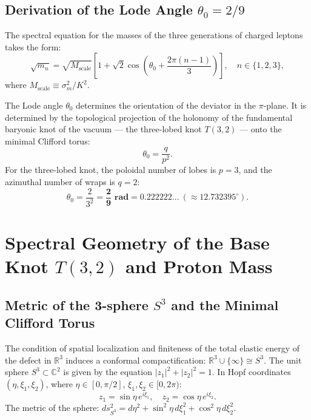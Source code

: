 \documentclass[12pt,a4paper]{article}
\begin{document}
	\subsection{Derivation of the Lode Angle $\theta_0 = 2/9$}
	The spectral equation for the masses of the three generations of charged leptons takes the form:
	\begin{equation}
	\sqrt{m_n} = \sqrt{M_{\text{scale}}} \left[ 1 + \sqrt{2} \cos\left( \theta_0 + \frac{2\pi(n-1)}{3} \right) \right], \quad n \in \{1, 2, 3\},
	\end{equation}
	where $M_{\text{scale}} \equiv \sigma_m^2 / K^2$.
	
	The Lode angle $\theta_0$ determines the orientation of the deviator in the $\pi$-plane. It is determined by the topological projection of the holonomy of the fundamental baryonic knot of the vacuum --- the three-lobed knot $T(3,2)$ --- onto the minimal Clifford torus:
	\begin{equation}
		\theta_0 = \frac{q}{p^2}.
	\end{equation}
	For the three-lobed knot, the poloidal number of lobes is $p=3$, and the azimuthal number of wraps is $q=2$:
	\begin{equation}
	\theta_0 = \frac{2}{3^2} = \mathbf{\frac{2}{9} \text{ rad}} = 0.222222\dots \ (\approx 12.732395^\circ).
	\end{equation}
	
\section{Spectral Geometry of the Base Knot $T(3,2)$ and Proton Mass}
	
	\subsection{Metric of the 3-sphere $S^3$ and the Minimal Clifford Torus}
	The condition of spatial localization and finiteness of the total elastic energy of the defect in $\mathbb{R}^3$ induces a conformal compactification: $\mathbb{R}^3 \cup \{\infty\} \cong S^3$. The unit sphere $S^3 \subset \mathbb{C}^2$ is given by the equation $|z_1|^2 + |z_2|^2 = 1$. In Hopf coordinates $(\eta, \xi_1, \xi_2)$, where $\eta \in [0, \pi/2]$, $\xi_1, \xi_2 \in [0, 2\pi)$:
	\begin{equation}
	z_1 = \sin\eta \, e^{i\xi_1}, \quad z_2 = \cos\eta \, e^{i\xi_2}.
	\end{equation}
	The metric of the sphere: $ds^2_{S^3} = d\eta^2 + \sin^2\eta \, d\xi_1^2 + \cos^2\eta \, d\xi_2^2$.
	
\end{document}
